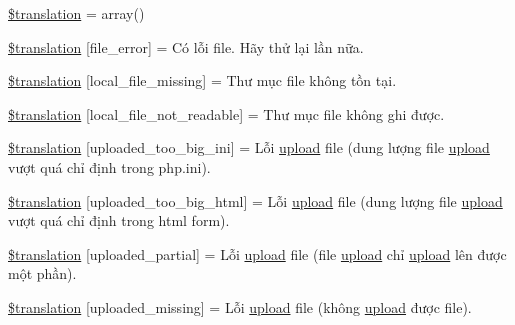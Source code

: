 \begin{DoxyCompactItemize}
\item 
\hyperlink{class_8upload_8vn___v_n_8php_a1f198d410fecc3871ebdd468d343a5e3}{\$translation} = array()
\item 
\hyperlink{class_8upload_8vn___v_n_8php_ac7498e49b9771b04698029aa61c70821}{\$translation} \mbox{[}\textquotesingle{}file\+\_\+error\textquotesingle{}\mbox{]} = \textquotesingle{}Có lỗi file. Hãy thử lại lần nữa.\textquotesingle{}
\item 
\hyperlink{class_8upload_8vn___v_n_8php_a6ec3d3a47ab70d77e7aa593e82ead10e}{\$translation} \mbox{[}\textquotesingle{}local\+\_\+file\+\_\+missing\textquotesingle{}\mbox{]} = \textquotesingle{}Thư mục file không tồn tại.\textquotesingle{}
\item 
\hyperlink{class_8upload_8vn___v_n_8php_a60104befef9b241f3a7a6a755618a4b3}{\$translation} \mbox{[}\textquotesingle{}local\+\_\+file\+\_\+not\+\_\+readable\textquotesingle{}\mbox{]} = \textquotesingle{}Thư mục file không ghi được.\textquotesingle{}
\item 
\hyperlink{class_8upload_8vn___v_n_8php_a6a08dcd0d3651fdd098568f6b2f0a42c}{\$translation} \mbox{[}\textquotesingle{}uploaded\+\_\+too\+\_\+big\+\_\+ini\textquotesingle{}\mbox{]} = \textquotesingle{}Lỗi \hyperlink{classupload}{upload} file (dung lượng file \hyperlink{classupload}{upload} vượt quá chỉ định trong php.\+ini).\textquotesingle{}
\item 
\hyperlink{class_8upload_8vn___v_n_8php_a623d5b8b92169f57d7e43458aa911cbb}{\$translation} \mbox{[}\textquotesingle{}uploaded\+\_\+too\+\_\+big\+\_\+html\textquotesingle{}\mbox{]} = \textquotesingle{}Lỗi \hyperlink{classupload}{upload} file (dung lượng file \hyperlink{classupload}{upload} vượt quá chỉ định trong html form).\textquotesingle{}
\item 
\hyperlink{class_8upload_8vn___v_n_8php_a967c17da21b0a2d3bd65cca3a9ca0ea8}{\$translation} \mbox{[}\textquotesingle{}uploaded\+\_\+partial\textquotesingle{}\mbox{]} = \textquotesingle{}Lỗi \hyperlink{classupload}{upload} file (file \hyperlink{classupload}{upload} chỉ \hyperlink{classupload}{upload} lên được một phần).\textquotesingle{}
\item 
\hyperlink{class_8upload_8vn___v_n_8php_a0cce433260be65f1f35853a6b4b8952b}{\$translation} \mbox{[}\textquotesingle{}uploaded\+\_\+missing\textquotesingle{}\mbox{]} = \textquotesingle{}Lỗi \hyperlink{classupload}{upload} file (không \hyperlink{classupload}{upload} được file).\textquotesingle{}
\item 

\end{DoxyCompactItemize}
